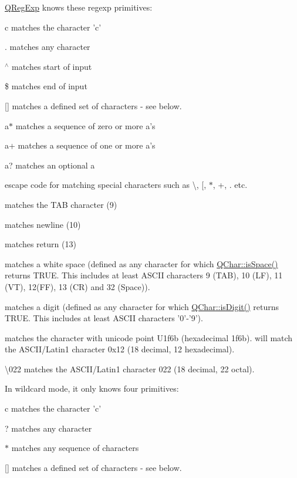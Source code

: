 \hyperlink{class_q_reg_exp}{Q\-Reg\-Exp} knows these regexp primitives\-: 
\begin{DoxyItemize}
\item {\ttfamily c} matches the character 'c' 
\item {\ttfamily .} matches any character 
\item {\ttfamily $^\wedge$} matches start of input 
\item {\ttfamily \$} matches end of input 
\item {\ttfamily \mbox{[}\mbox{]}} matches a defined set of characters -\/ see below. 
\item {\ttfamily a$\ast$} matches a sequence of zero or more a's 
\item {\ttfamily a+} matches a sequence of one or more a's 
\item {\ttfamily a?} matches an optional a 
\item {\ttfamily {\ttfamily } } escape code for matching special characters such as \textbackslash{}, \mbox{[}, $\ast$, +, . etc. 
\item {\ttfamily } matches the T\-A\-B character (9) 
\item {\ttfamily \par
} matches newline (10) 
\item {\ttfamily } matches return (13) 
\item {\ttfamily } matches a white space (defined as any character for which \hyperlink{class_q_char_a9aedb2cee15aa1efb95a4b548a22d1f5}{Q\-Char\-::is\-Space()} returns T\-R\-U\-E. This includes at least A\-S\-C\-I\-I characters 9 (T\-A\-B), 10 (L\-F), 11 (V\-T), 12(F\-F), 13 (C\-R) and 32 (Space)). 
\item {\ttfamily } matches a digit (defined as any character for which \hyperlink{class_q_char_a610bceef174c008df7c7acbbdb76cdf3}{Q\-Char\-::is\-Digit()} returns T\-R\-U\-E. This includes at least A\-S\-C\-I\-I characters '0'-\/'9'). 
\item {\ttfamily } matches the character with unicode point U1f6b (hexadecimal 1f6b).  will match the A\-S\-C\-I\-I/\-Latin1 character 0x12 (18 decimal, 12 hexadecimal). 
\item {\ttfamily \textbackslash{}022} matches the A\-S\-C\-I\-I/\-Latin1 character 022 (18 decimal, 22 octal). 
\end{DoxyItemize}

In wildcard mode, it only knows four primitives\-: 
\begin{DoxyItemize}
\item {\ttfamily c} matches the character 'c' 
\item {\ttfamily ?} matches any character 
\item {\ttfamily $\ast$} matches any sequence of characters 
\item {\ttfamily \mbox{[}\mbox{]}} matches a defined set of characters -\/ see below. 
\end{DoxyItemize}

